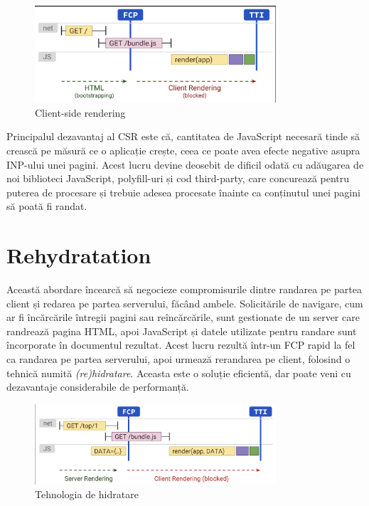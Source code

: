 \documentclass[12pt, a4paper]{report}
\begin{document}
\begin{figure}[htbp]
	\centering
	\includegraphics[width=0.8\textwidth]{csr.png}
	\caption{Client-side rendering}
	\label{fig:csr}
\end{figure}

Principalul dezavantaj al CSR este că, cantitatea de JavaScript necesară tinde să crească pe măsură ce o aplicație crește, ceea ce poate avea efecte negative asupra INP-ului unei pagini. Acest lucru devine deosebit de dificil odată cu adăugarea de noi biblioteci JavaScript, polyfill-uri și cod third-party, care concurează pentru puterea de procesare și trebuie adesea procesate înainte ca conținutul unei pagini să poată fi randat.

\section{Rehydratation}

Această abordare încearcă să negocieze compromisurile dintre randarea pe partea client și redarea pe partea serverului, făcând ambele. Solicitările de navigare, cum ar fi încărcările întregii pagini sau reîncărcările, sunt gestionate de un server care randrează pagina HTML, apoi JavaScript și datele utilizate pentru randare sunt încorporate în documentul rezultat. Acest lucru rezultă într-un FCP rapid la fel ca randarea pe partea serverului, apoi urmează rerandarea pe client, folosind o tehnică numită \emph{(re)hidratare}. Aceasta este o soluție eficientă, dar poate veni cu dezavantaje considerabile de performanță.

\begin{figure}[htbp]
	\centering
	\includegraphics[width=0.8\textwidth]{hydratation.png}
	\caption{Tehnologia de hidratare}
	\label{fig:hydratation}
\end{figure}
\end{document}
